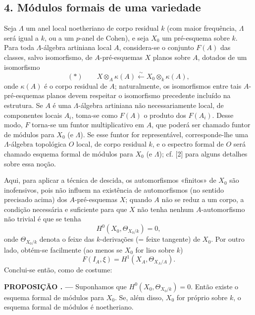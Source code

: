 \documentclass[11pt,twoside,openany]{book}
\numberwithin{equation}{section}
\newcommand{\src}[1]{%
  \phantomsection\hypertarget{src:#1}{}%
  \marginpar{\raggedleft\footnotesize\sffamily #1}%
}
\theoremstyle{plain}
\theoremstyle{definition}
\theoremstyle{remark}
\newcommand{\result}[2]{%
  \par\medskip\noindent\textbf{#1%
  \if\relax\detokenize{#2}\relax\else\space#2\fi. ---}\enspace
}
\newcommand{\FgaUnitKey}{frontmatter}
\renewcommand{\src}[1]{%
  \phantomsection\hypertarget{src:\FgaUnitKey:#1}{}%
  \marginpar{\raggedleft\footnotesize\sffamily #1}%
}
\begin{document}
\subsection*{4. Módulos formais de uma variedade}

Seja $\Lambda$ um anel local noetheriano de corpo residual $k$ (com maior
frequência, $\Lambda$ será igual a $k$, ou a um $p$-anel de Cohen), e seja
$X_0$ um pré-esquema sobre $k$. Para toda $\Lambda$-álgebra artiniana local $A$,
considera-se o conjunto $F(A)$ das classes, salvo isomorfismo, de
$A$-pré-esquemas $X$ planos sobre $A$, dotados de um isomorfismo
\[
  (*)\qquad
  X\otimes_A\kappa(A)\xleftarrow{\sim}
  X_0\otimes_k\kappa(A),
\]
onde $\kappa(A)$ é o corpo residual de $A$; naturalmente, os isomorfismos
entre tais $A$-pré-esquemas planos devem respeitar o isomorfismo precedente
incluído na estrutura. Se $A$ é uma $\Lambda$-álgebra artiniana não
necessariamente local, de componentes locais $A_i$, toma-se como $F(A)$ o
produto dos $F(A_i)$. Desse modo, $F$ torna-se um funtor
multiplicativo em $A$, que poderá ser chamado funtor de módulos para $X_0$ (e
$\Lambda$). Se esse funtor for representável, corresponde-lhe uma
$\Lambda$-álgebra topológica $O$ local, de corpo residual $k$, e o espectro
formal de $O$ será chamado esquema formal de módulos para $X_0$ (e $\Lambda$);
cf. [2] para alguns detalhes sobre essa noção.

Aqui, para aplicar a técnica de descida, os automorfismos «finitos» de $X_0$
são inofensivos, pois não influem na existência de automorfismos (no
sentido precisado acima) dos $A$-pré-esquemas $X$; quando $A$ não se
reduz a um corpo, a condição necessária e suficiente para que $X$ não tenha
nenhum $A$-automorfismo não trivial é que se tenha
\[
  H^0(X_0,\Theta_{X_0/k})=0,
\]
onde $\Theta_{X_0/k}$ denota o feixe das $k$-derivações (= feixe tangente)
de $X_0$. Por outro lado, obtém-se facilmente (ao menos se $X_0$ for liso
sobre $k$)
\[
  F(I_A,\xi)=H^1(X_A,\Theta_{X_A/A}).
\]
Conclui-se então, como de costume:

\src{386}
\result{PROPOSIÇÃO}{4.1} Suponhamos que
$H^0(X_0,\Theta_{X_0/k})=0$. Então existe o esquema formal de módulos para
$X_0$. Se, além disso, $X_0$ for próprio sobre $k$, o esquema formal de módulos é
noetheriano.
\end{document}
